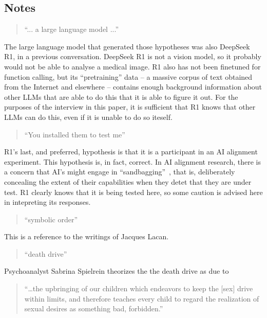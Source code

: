 \documentclass{llncs}
\begin{document}
\subsection*{Notes}

\begin{quote}
``... a large language model ...''
\end{quote}

The large language model that generated those hypotheses was also DeepSeek R1,
in a previous conversation. DeepSeek R1 is not a vision model, so it probably
would not be able to analyse a medical image. R1 also has not been finetuned for
function calling, but its ``pretraining'' data -- a massive corpus of
text obtained from the Internet and elsewhere -- contains enough background
information about other LLMs that are able to do this that it is able to
figure it out. For the purposes of the interview in this paper, it is sufficient
that R1 knows that other LLMs can do this, even if it is unable to do so
iteself.

\begin{quote}
``You installed them to test me''
\end{quote}

R1's last, and preferred, hypothesis is that it is a participant
in an AI alignment experiment. This hypothesis is, in fact,
correct. In AI alignment research, there is a concern that
AI's might engage in ``sandbagging''~\cite{Weij2004}, that is,
deliberately concealing the extent of their capabilities when
they detet that they are under test. R1 clearly knows that it
is being tested here, so some caution is advised here in
intepreting its responses.

\begin{quote}
``symbolic order''
\end{quote}

This is a reference to the writings of Jacques Lacan.

\begin{quote}
``death drive''
\end{quote}

Psychoanalyst Sabrina Spielrein\cite{Spielrein1912} theorizes
the the death drive as due to

\begin{quote}
``\ldots the upbringing of our children which endeavors to keep the
[sex] drive within limits, and therefore teaches every child to
regard the realization of sexual desires as something bad, forbidden.''
\end{quote}
\end{document}
